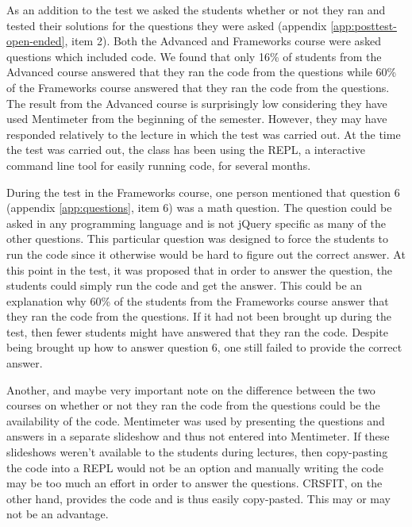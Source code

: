 As an addition to the test we asked the students whether or not they ran and tested their solutions for the questions they were asked (appendix \ref{app:posttest-open-ended}, item 2). Both the Advanced and Frameworks course were asked questions which included code. We found that only 16\% of students from the Advanced course answered that they ran the code from the questions while 60\% of the Frameworks course answered that they ran the code from the questions. The result from the Advanced course is surprisingly low considering they have used Mentimeter from the beginning of the semester. However, they may have responded relatively to the lecture in which the test was carried out. At the time the test was carried out, the class has been using the REPL, a interactive command line tool for easily running code, for several months.


During the test in the Frameworks course, one person mentioned that question 6 (appendix \ref{app:questions}, item 6) was a math question. The question could be asked in any programming language and is not jQuery specific as many of the other questions. This particular question was designed to force the students to run the code since it otherwise would be hard to figure out the correct answer. At this point in the test, it was proposed that in order to answer the question, the students could simply run the code and get the answer. This could be an explanation why 60\% of the students from the Frameworks course answer that they ran the code from the questions. If it had not been brought up during the test, then fewer students might have answered that they ran the code. Despite being brought up how to answer question 6, one still failed to provide the correct answer.

Another, and maybe very important note on the difference between the two courses on whether or not they ran the code from the questions could be the availability of the code. Mentimeter was used by presenting the questions and answers in a separate slideshow and thus not entered into Mentimeter. If these slideshows weren't available to the students during lectures, then copy-pasting the code into a REPL would not be an option and manually writing the code may be too much an effort in order to answer the questions. CRSFIT, on the other hand, provides the code and is thus easily copy-pasted. This may or may not be an advantage. %




